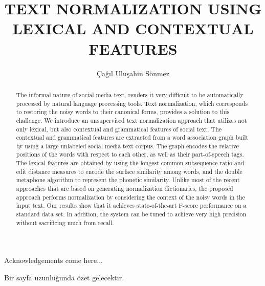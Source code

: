 \documentclass[a4paper,onesided,12pt]{report}
\title{\uppercase{Text Normalization Using Lexical and Contextual Features}}
\author{Çağıl Uluşahin Sönmez}
\begin{document}
\setlength{\abovedisplayskip}{1cm}
\setlength{\belowdisplayskip}{1cm}

\makemstitle %
\makeapprovalpage
\begin{acknowledgements}
Acknowledgements come here...
\end{acknowledgements}
\begin{abstract}
The informal nature of social media text, renders it very difficult to be automatically processed by natural language processing tools. Text normalization, which corresponds to restoring the noisy words to their canonical forms, provides a solution to this challenge.
We introduce an unsupervised text normalization approach that utilizes not only lexical, but also contextual and grammatical features of social text.
The contextual and grammatical features are extracted from a word association graph built by using a large unlabeled social media text corpus.
The graph encodes the relative positions of the words with respect to each other, as well as their part-of-speech tags.
The lexical features are obtained by using the longest common subsequence ratio and edit distance measures to encode the surface similarity among words, and the double metaphone algorithm to represent the phonetic similarity. Unlike most of the recent approaches that are based on generating normalization dictionaries, the proposed approach performs normalization by considering the context of the noisy words in the input text.
Our results show that it achieves state-of-the-art F-score performance on a standard data set. In addition, the system can be tuned to achieve very high precision without sacrificing much from recall.
\end{abstract}
\begin{ozet}
Bir sayfa uzunluğunda özet gelecektir.
\end{ozet}
\tableofcontents
\listoffigures
\listoftables
\begin{symbols}
%
\sym{ }{}
\sym{ }{}

\end{symbols}
\end{document}
